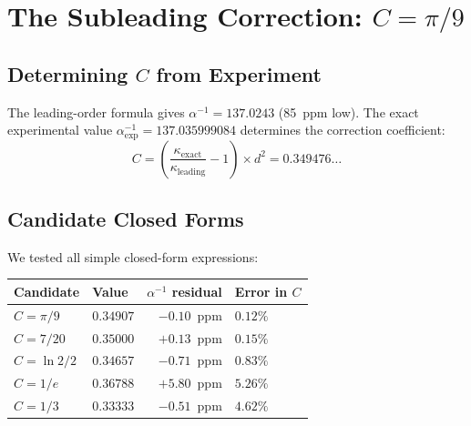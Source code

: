 \documentclass[12pt,a4paper]{article}
\theoremstyle{definition}
\theoremstyle{remark}
\begin{document}
\section{The Subleading Correction: $C = \pi/9$}
\label{sec:correction}

\subsection{Determining $C$ from Experiment}

The leading-order formula gives $\alpha^{-1} = 137.0243$ (85~ppm low).
The exact experimental value $\alpha^{-1}_{\mathrm{exp}} = 137.035999084$
determines the correction coefficient:
\begin{equation}
C = \left(\frac{\kappa_{\mathrm{exact}}}{\kappa_{\mathrm{leading}}} - 1\right)
    \times d^2
= 0.349476\ldots
\end{equation}

\subsection{Candidate Closed Forms}

We tested all simple closed-form expressions:

\begin{center}
\renewcommand{\arraystretch}{1.3}
\begin{tabular}{llrl}
\toprule
\textbf{Candidate} & \textbf{Value} & \textbf{$\alpha^{-1}$ residual} & \textbf{Error in $C$} \\
\midrule
$C = \pi/9$   & $0.34907$ & $-0.10$~ppm & $0.12\%$ \\
$C = 7/20$    & $0.35000$ & $+0.13$~ppm & $0.15\%$ \\
$C = \ln 2/2$ & $0.34657$ & $-0.71$~ppm & $0.83\%$ \\
$C = 1/e$     & $0.36788$ & $+5.80$~ppm & $5.26\%$ \\
$C = 1/3$     & $0.33333$ & $-0.51$~ppm & $4.62\%$ \\
\bottomrule
\end{tabular}
\end{center}
\end{document}
